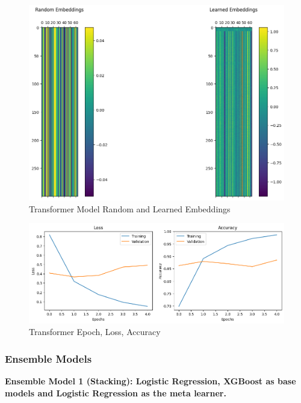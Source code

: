 \begin{figure}[h!]  
    \centering
    \includegraphics[width=1.0\textwidth]{Images/T EMBED.png}  
    \caption{Transformer Model Random and Learned Embeddings}
    \label{lstm t embed}  %
\end{figure}

\begin{figure}[h!]  
    \centering
    \includegraphics[width=1.0\textwidth]{Images/T LOSS EPOCH.png}  
    \caption{Transformer Epoch, Loss, Accuracy}
    \label{lstm t epch}  %
\end{figure}

\pagebreak

\subsubsection{Ensemble Models}
\noindent
\textbf{Ensemble Model 1 (Stacking): Logistic Regression, XGBoost as base models and Logistic Regression as the meta learner. }

